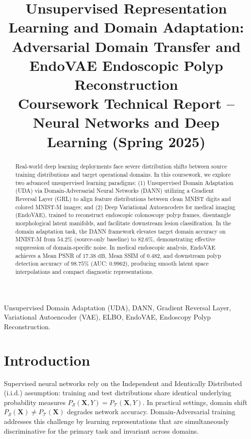 \documentclass[conference]{IEEEtran}
\begin{document}
\title{Unsupervised Representation Learning and Domain Adaptation: Adversarial Domain Transfer and EndoVAE Endoscopic Polyp Reconstruction\\
\large Coursework Technical Report -- Neural Networks and Deep Learning (Spring 2025)}

\author{
}

\maketitle

\begin{abstract}
Real-world deep learning deployments face severe distribution shifts between source training distributions and target operational domains. In this coursework, we explore two advanced unsupervised learning paradigms: (1) Unsupervised Domain Adaptation (UDA) via Domain-Adversarial Neural Networks (DANN) utilizing a Gradient Reversal Layer (GRL) to align feature distributions between clean MNIST digits and colored MNIST-M images; and (2) Deep Variational Autoencoders for medical imaging (EndoVAE), trained to reconstruct endoscopic colonoscopy polyp frames, disentangle morphological latent manifolds, and facilitate downstream lesion classification. In the domain adaptation task, the DANN framework elevates target domain accuracy on MNIST-M from $54.2\%$ (source-only baseline) to $82.6\%$, demonstrating effective suppression of domain-specific noise. In medical endoscopic analysis, EndoVAE achieves a Mean PSNR of $17.38\text{ dB}$, Mean SSIM of $0.482$, and downstream polyp detection accuracy of $98.75\%$ (AUC: $0.9962$), producing smooth latent space interpolations and compact diagnostic representations.
\end{abstract}

\begin{IEEEkeywords}
Unsupervised Domain Adaptation (UDA), DANN, Gradient Reversal Layer, Variational Autoencoder (VAE), ELBO, EndoVAE, Endoscopy Polyp Reconstruction.
\end{IEEEkeywords}

\section{Introduction}
Supervised neural networks rely on the Independent and Identically Distributed (i.i.d.) assumption: training and test distributions share identical underlying probability measures $P_{\mathcal{S}}(\mathbf{X}, Y) = P_{\mathcal{T}}(\mathbf{X}, Y)$. In practical settings, domain shift $P_{\mathcal{S}}(\mathbf{X}) \ne P_{\mathcal{T}}(\mathbf{X})$ degrades network accuracy. Domain-Adversarial training addresses this challenge by learning representations that are simultaneously discriminative for the primary task and invariant across domains.
\end{document}
